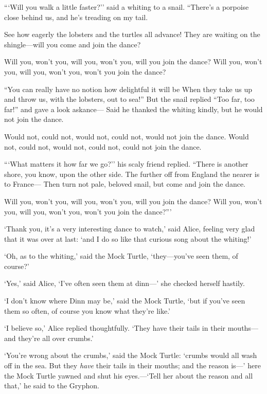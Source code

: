 \documentclass[12pt,openany]{memoir}
\renewenvironment{quote}%
  {\list{}{\leftmargin=2\parindent\rightmargin=0in}\item[]}%
  {\endlist}
\begin{document}
\begin{quote}
```Will you walk a little faster?'' said a whiting to a snail.
``There's a porpoise close behind us, and he's treading on my tail.

See how eagerly the lobsters and the turtles all advance!
They are waiting on the shingle---will you come and join the dance?

Will you, won't you, will you, won't you, will you join the dance?
Will you, won't you, will you, won't you, won't you join the dance?

``You can really have no notion how delightful it will be
When they take us up and throw us, with the lobsters, out to sea!''
 But the snail replied ``Too far, too far!'' and gave a look askance---
Said he thanked the whiting kindly, but he would not join the dance.

Would not, could not, would not, could not, would not join the dance.
Would not, could not, would not, could not, could not join the dance.

```What matters it how far we go?'' his scaly friend replied.
``There is another shore, you know, upon the other side.
The further off from England the nearer is to France---
Then turn not pale, beloved snail, but come and join the dance.

Will you, won't you, will you, won't you, will you join the dance?
Will you, won't you, will you, won't you, won't you join the dance?'''
\end{quote}

`Thank you, it's a very interesting dance to watch,' said Alice, feeling very glad that it was over at last: `and I do so like that curious song about the whiting!'

`Oh, as to the whiting,' said the Mock Turtle, `they---you've seen them, of course?'

`Yes,' said Alice, `I've often seen them at dinn---' she checked herself hastily.

`I don't know where Dinn may be,' said the Mock Turtle, `but if you've seen them so often, of course you know what they're like.'

`I believe so,' Alice replied thoughtfully. `They have their tails in their mouths---and they're all over crumbs.'

`You're wrong about the crumbs,' said the Mock Turtle: `crumbs would all wash off in the sea. But they \textit{have} their tails in their mouths; and the reason is---' here the Mock Turtle yawned and shut his eyes.---`Tell her about the reason and all that,' he said to the Gryphon.
\end{document}
